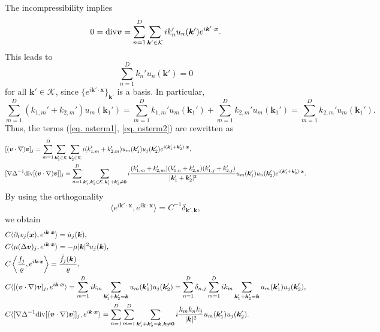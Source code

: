 \documentclass[a4paper,11pt,fleqn]{article}
\begin{document}
The incompressibility implies 
\begin{align}
    0 = {\rm div}{\bm v} = \sum_{n=1}^D\sum_{{\bm k}'\in \mathcal{K}}{ik_n' u_n({\bm k}')e^{i{\bm k}'\cdot{\bm x}}}.
\end{align}
This leads to 
\begin{equation}
    \sum_{n=1}^D k_n' u_n({\bm k}') = 0
\end{equation}
for all ${\bm k}'\in \mathcal{K}$, since $\{e^{i{\bm k}'\cdot{\bm x}}\}_{{\bm k}'}$ is a basis. In particular, 
\begin{equation}
    \sum_{m=1}^D (k_{1,m}' + k_{2,m}')u_m({\bm k}_1') = \sum_{m=1}^Dk_{1,m}'u_m({\bm k}_1')+\sum_{m=1}^Dk_{2,m}'u_m({\bm k}_1') = \sum_{m=1}^Dk_{2,m}'u_m({\bm k}_1').
\end{equation}
Thus, the terms (\ref{eq. nsterm1}, \ref{eq. nsterm2}) are rewritten as 
\begin{align}
    &[({\bm v}\cdot \nabla){\bm v}]_j =  \sum_{m=1}^D\sum_{{\bm k}_1'\in \mathcal{K}}\sum_{{\bm k}_2'\in \mathcal{K}} i(k_{1,m}'+k_{2,m}') u_m({\bm k}_1')u_j({\bm k}_2')e^{i({\bm k}_1'+{\bm k}_2')\cdot{\bm x}}, \\
    &[\nabla \Delta^{-1}{\rm div}[({\bm v}\cdot \nabla){\bm v}]]_j = \sum_{n=1}^D\sum_{{\bm k}_1', {\bm k}_2'\in \mathcal{K}, {\bm k}_1'+{\bm k}_2'\neq {\bm 0}}  i\frac{(k_{1,m}'+k_{2,m}')(k_{1,n}'+k_{2,n}')(k_{1,j}'+k_{2,j}')}{|{\bm k}_1' + {\bm k}_2'|^2} u_m({\bm k}_1')u_n({\bm k}_2')e^{i({\bm k}_1'+{\bm k}_2')\cdot{\bm x}}.
\end{align}
By using the orthogonality
\begin{equation}
    \langle e^{i{\bm k}'\cdot{\bm x}},e^{i{\bm k}\cdot{\bm x}}  \rangle = C^{-1} \delta_{{\bm k}',{\bm k}}, 
\end{equation}
we obtain 
\begin{align}
    &C\langle \partial_t v_j({\bm x}), e^{i{\bm k}\cdot{\bm x}}  \rangle  = \dot{u}_j({\bm k}), \\
    &C\langle \mu (\Delta {\bm v})_j, e^{i{\bm k}\cdot{\bm x}}  \rangle  =-\mu|{\bm k}|^2 u_j({\bm k}), \\
    &C\left\langle \frac{f_j}{\varrho}, e^{i{\bm k}\cdot{\bm x}}  \right\rangle  =\frac{\hat{f}_j({\bm k})}{\varrho}, \\
    &C\langle [({\bm v}\cdot \nabla){\bm v}]_j, e^{i{\bm k}\cdot{\bm x}}  \rangle  = \sum_{m=1}^D ik_m\sum_{{\bm k}_1'+{\bm k}_2' = {\bm k}}u_m({\bm k}_1')u_j({\bm k}_2') = \sum_{n=1}^D \delta_{n,j} \sum_{m=1}^D ik_m\sum_{{\bm k}_1'+{\bm k}_2' = {\bm k}}u_m({\bm k}_1')u_j({\bm k}_2'),\\
    &C\langle [\nabla \Delta^{-1}{\rm div}[({\bm v}\cdot \nabla){\bm v}]]_j, e^{i{\bm k}\cdot{\bm x}}  
    \rangle = \sum_{n=1}^D\sum_{m=1}^D\sum_{{\bm k}_1'+{\bm k}_2' = {\bm k}, {\bm k}\neq {\bm 0}} i\frac{k_m k_n k_j}{|{\bm k}|^2}  u_m({\bm k}_1')u_j({\bm k}_2').
\end{align}
\end{document}
